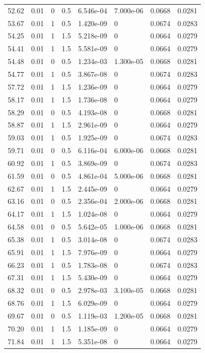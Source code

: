 \documentclass[preview]{standalone}
\begin{document}
{{{\begin{tabular}{L{1.2cm}C{1.2cm} C{0.3cm}C{0.5cm} C{1.4cm}C{1.4cm} C{1.4cm}C{1.4cm}}
  52.62  &  0.01  & 0     & 0.5 &  6.546e-04  & 7.000e-06  & 0.0668 &  0.0281   \\ 
  53.67  &  0.01  & 1     & 0.5 &  1.420e-09  & 0  & 0.0674 &  0.0283   \\ 
  54.25  &  0.01  & 1     & 1.5 &  5.218e-09  & 0  & 0.0664 &  0.0279   \\ 
  54.41  &  0.01  & 1     & 1.5 &  5.581e-09  & 0  & 0.0664 &  0.0279   \\ 
  54.48  &  0.01  & 0     & 0.5 &  1.234e-03  & 1.300e-05  & 0.0668 &  0.0281   \\ 
  54.77  &  0.01  & 1     & 0.5 &  3.867e-08  & 0  & 0.0674 &  0.0283   \\ 
  57.72  &  0.01  & 1     & 1.5 &  1.236e-09  & 0  & 0.0664 &  0.0279   \\ 
  58.17  &  0.01  & 1     & 1.5 &  1.736e-08  & 0  & 0.0664 &  0.0279   \\ 
  58.29  &  0.01  & 0     & 0.5 &  4.193e-08  & 0  & 0.0668 &  0.0281   \\ 
  58.87  &  0.01  & 1     & 1.5 &  2.961e-09  & 0  & 0.0664 &  0.0279   \\ 
  59.03  &  0.01  & 1     & 0.5 &  1.925e-09  & 0  & 0.0674 &  0.0283   \\ 
  59.71  &  0.01  & 0     & 0.5 &  6.116e-04  & 6.000e-06  & 0.0668 &  0.0281   \\ 
  60.92  &  0.01  & 1     & 0.5 &  3.869e-09  & 0  & 0.0674 &  0.0283   \\ 
  61.59  &  0.01  & 0     & 0.5 &  4.861e-04  & 5.000e-06  & 0.0668 &  0.0281   \\ 
  62.67  &  0.01  & 1     & 1.5 &  2.445e-09  & 0  & 0.0664 &  0.0279   \\ 
  63.16  &  0.01  & 0     & 0.5 &  2.356e-04  & 2.000e-06  & 0.0668 &  0.0281   \\ 
  64.17  &  0.01  & 1     & 1.5 &  1.024e-08  & 0  & 0.0664 &  0.0279   \\ 
  64.58  &  0.01  & 0     & 0.5 &  5.642e-05  & 1.000e-06  & 0.0668 &  0.0281   \\ 
  65.38  &  0.01  & 1     & 0.5 &  3.014e-08  & 0  & 0.0674 &  0.0283   \\ 
  65.91  &  0.01  & 1     & 1.5 &  7.976e-09  & 0  & 0.0664 &  0.0279   \\ 
  66.23  &  0.01  & 1     & 0.5 &  1.783e-08  & 0  & 0.0674 &  0.0283   \\ 
  67.31  &  0.01  & 1     & 1.5 &  5.430e-09  & 0  & 0.0664 &  0.0279   \\ 
  68.32  &  0.01  & 0     & 0.5 &  2.978e-03  & 3.100e-05  & 0.0668 &  0.0281   \\ 
  68.76  &  0.01  & 1     & 1.5 &  6.029e-09  & 0  & 0.0664 &  0.0279   \\ 
  69.67  &  0.01  & 0     & 0.5 &  1.119e-03  & 1.200e-05  & 0.0668 &  0.0281   \\ 
  70.20  &  0.01  & 1     & 1.5 &  1.185e-09  & 0  & 0.0664 &  0.0279   \\ 
  71.84  &  0.01  & 1     & 1.5 &  5.351e-08  & 0  & 0.0664 &  0.0279   \\ 
\hline 
\end{tabular} 

}}}
\end{document}
